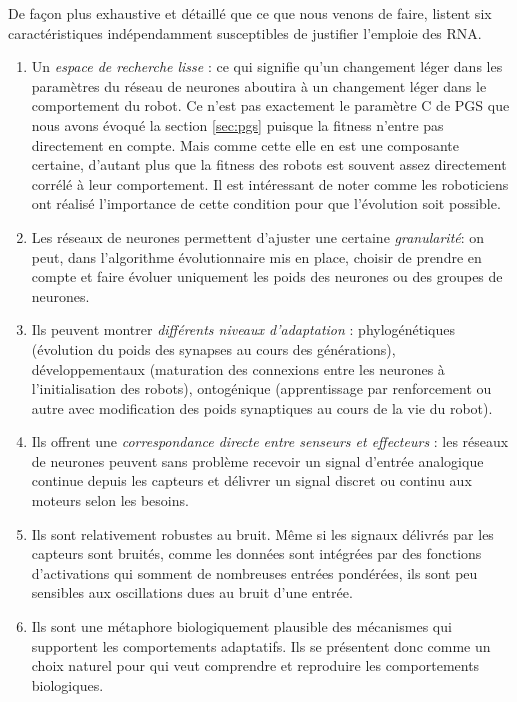 De façon plus exhaustive et détaillé que ce que nous venons de faire, \citet[p. 39]{nolfi00evolrobobiolintetechselfmach} listent six caractéristiques indépendamment susceptibles de justifier l'emploie des RNA.
\begin{enumerate}
	\item Un \emph{espace de recherche lisse} : ce qui signifie qu'un changement léger dans les paramètres du réseau de neurones aboutira à un changement léger dans le comportement du robot. Ce n'est pas exactement le paramètre C de PGS que nous avons évoqué la section \ref{sec:pgs} puisque la fitness n'entre pas directement en compte. Mais comme cette elle en est une composante certaine, d'autant plus que la fitness des robots est souvent assez directement corrélé à leur comportement. Il est intéressant de noter comme les roboticiens ont réalisé l'importance de cette condition pour que l'évolution soit possible.
	\item Les réseaux de neurones permettent d'ajuster une certaine \emph{granularité}: on peut, dans l'algorithme évolutionnaire mis en place, choisir de prendre en compte et faire évoluer uniquement les poids des neurones ou des groupes de neurones. 
	\item Ils peuvent montrer \emph{différents niveaux d'adaptation} : phylogénétiques (évolution du poids des synapses au cours des générations), développementaux (maturation des connexions entre les neurones à l'initialisation des robots), ontogénique (apprentissage par renforcement ou autre avec modification des poids synaptiques au cours de la vie du robot).
	\item Ils offrent une \emph{correspondance directe entre senseurs et effecteurs} : les réseaux de neurones peuvent sans problème recevoir un signal d'entrée analogique continue depuis les capteurs et délivrer un signal discret ou continu aux moteurs selon les besoins.
	\item Ils sont relativement robustes au bruit. Même si les signaux délivrés par les capteurs sont bruités, comme les données sont intégrées par des fonctions d'activations qui somment de nombreuses entrées pondérées, ils sont peu sensibles aux oscillations dues au bruit d'une entrée.
	\item Ils sont une métaphore biologiquement plausible des mécanismes qui supportent les comportements adaptatifs. Ils se présentent donc comme un choix naturel pour qui veut comprendre et reproduire les comportements biologiques. \\
		\citep[Plus ou moins librement adapté de ][p. 39 les emphases ont toutes été ajoutées]{nolfi00evolrobobiolintetechselfmach}
\end{enumerate}
